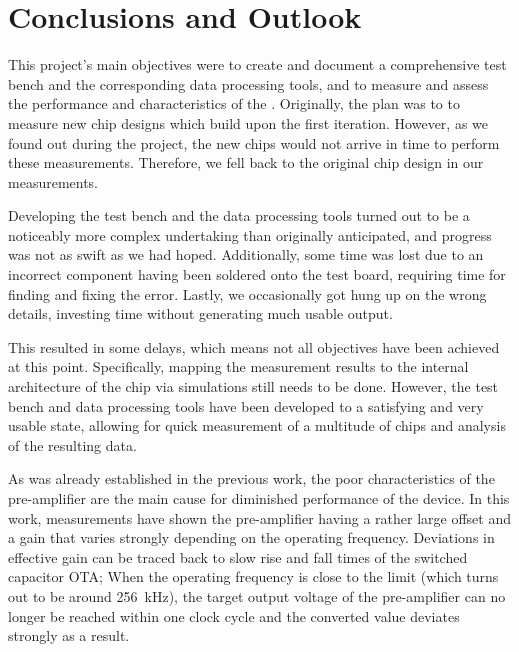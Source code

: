 \chapter{Conclusions and Outlook}
\label{chap:conclusions}

This project's  main objectives  were to create  and document  a comprehensive
test bench  and the corresponding  data processing  tools, and to  measure and
assess  the performance  and  characteristics of  the  \sdm.  Originally,  the
plan  was  to  to  measure  new  chip  designs  which  build  upon  the  first
iteration. However, as  we found out during  the project, the new  chips would
not arrive in  time to perform these measurements. Therefore, we  fell back to
the original chip design in our measurements.

Developing the test  bench  and  the  data processing tools turned out to be a
noticeably more  complex undertaking than originally anticipated, and progress
was not as swift as we had hoped.  Additionally,  some time was lost due to an
incorrect component having been soldered onto  the  test board, requiring time
for finding and fixing the error. Lastly, we  occasionally  got hung up on the
wrong  details,  investing  time  without  generating   much   usable  output.

This resulted  in  some  delays,  which  means  not  all  objectives have been
achieved  at  this point. Specifically, mapping the measurement results to the
internal  architecture  of  the  chip  via simulations still needs to be done.
However, the test bench and data processing tools  have  been  developed  to a
satisfying and  very  usable  state,  allowing  for  quick  measurement  of  a
multitude of chips and analysis of the resulting data.

As  was  already established in the previous  work\cite{ref:gloor},  the  poor
characteristics  of  the pre-amplifier  are  the  main  cause  for  diminished
performance  of  the  device.  In  this  work,  measurements  have  shown  the
pre-amplifier having a  rather  large  offset  and a gain that varies strongly
depending  on  the operating frequency. Deviations in effective  gain  can  be
traced back to slow rise and  fall  times  of the switched capacitor OTA; When
the operating  frequency  is  close to the limit (which turns out to be around
\SI{256}{\kilo\hertz}), the  target output voltage of the pre-amplifier can no
longer  be  reached within one clock cycle and the  converted  value  deviates
strongly as a result.

